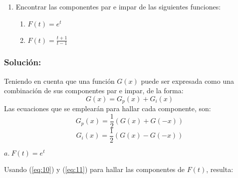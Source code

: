 \begin{multicols}{2}
\begin{enumerate}[leftmargin=15pt, resume]
    \item Encontrar las componentes par e impar de las siguientes funciones:
    \begin{enumerate}
        \item $F(t) = e^{t}$
        \item $F(t) = \frac{t+1}{t-1}$
    \end{enumerate}
\end{enumerate}

\subsubsection*{\textbf{Solución:}}
Teniendo en cuenta que una función $G(x)$ puede ser expresada como una combinación de sus componentes par e impar, de la forma:
\begin{equation}
    G(x) = G_p(x) + G_i(x)
    \label{eq:9}
\end{equation}
Las ecuaciones que se emplearán para hallar cada componente, son:
\begin{equation}
    G_p(x) = \frac{1}{2}\left(G(x) + G(-x)\right)
    \label{eq:10}
\end{equation}
\begin{equation}
    G_i(x) = \frac{1}{2}\left(G(x) - G(-x)\right)
    \label{eq:11}
\end{equation}

$a.~ F(t) = e^{t}$

Usando (\ref{eq:10}) y (\ref{eq:11}) para hallar las componentes de $F(t)$, resulta:


\end{multicols}

